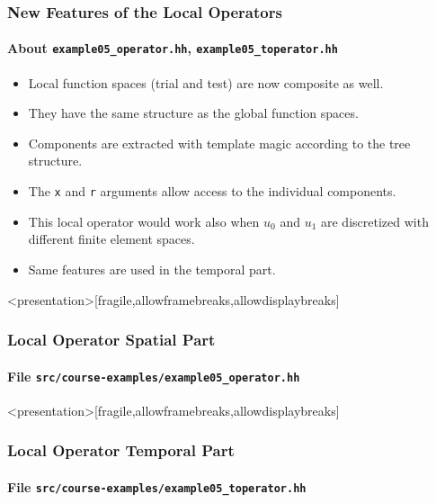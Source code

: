 \begin{frame}
\frametitle{New Features of the Local Operators}
\framesubtitle{About \lstinline{example05_operator.hh}, \lstinline{example05_toperator.hh}}
\begin{itemize}
\item Local function spaces (trial and test) are now composite as well.
\item They have the same structure as the global function spaces.
\item Components are extracted with template magic according to the tree structure.
\item The \lstinline{x} and \lstinline{r} arguments allow access to the individual components.
\item This local operator would work also when $u_0$ and $u_1$ are discretized
with different finite element spaces.
\item Same features are used in the temporal part.
\end{itemize}
\end{frame}

\begin{frame}<presentation>[fragile,allowframebreaks,allowdisplaybreaks]
\frametitle<presentation>{Local Operator Spatial Part}
\framesubtitle<presentation>{File \texttt{src/course-examples/example05\_operator.hh}}

\end{frame}

\begin{frame}<presentation>[fragile,allowframebreaks,allowdisplaybreaks]
\frametitle<presentation>{Local Operator Temporal Part}
\framesubtitle<presentation>{File \texttt{src/course-examples/example05\_toperator.hh}}

\end{frame}

